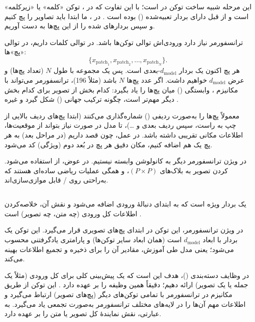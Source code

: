 این مرحله شبیه ساخت توکن در  است؛ با این تفاوت که در ، توکن «کلمه» یا «زیرکلمه» است و از قبل دارای بردار تعبیه‌شده () بوده است \cite{vaswani2017attention}. در  \cite{dosovitskiy2020image}، ما ابتدا باید تصاویر را پچ کنیم و سپس بردارهای ‌شده را از این پچ‌ها به دست آوریم.

ترانسفورمر نیاز دارد ورودی‌اش توالی توکن‌ها باشد. در  توالی کلمات داریم، در  توالی «پچ»‌ها:
\[
\{ x_{\text{patch}_1}, x_{\text{patch}_2}, \dots, x_{\text{patch}_N} \}.
\]
هر پچ اکنون یک بردار \(d_{\text{model}}\)-بعدی است. پس یک مجموعه با طول \(N\) (تعداد پچ‌ها) و عرض \(d_{\text{model}}\) خواهیم داشت.  
اگر عدد پچ‌ها \(N\) باشد (مثلاً 196)، ترانسفورمر می‌تواند با مکانیزم ، وابستگی () میان پچ‌ها را یاد بگیرد: کدام بخش از تصویر برای کدام بخش دیگر مهم‌تر است، چگونه ترکیب جهانی () شکل گیرد و غیره \cite{vaswani2017attention,dosovitskiy2020image}.

معمولاً پچ‌ها را به‌صورت ردیفی () شماره‌گذاری می‌کنند (ابتدا پچ‌های ردیف بالایی از چپ به راست، سپس ردیف بعدی و …)، تا مدل در صورت نیاز بتواند از موقعیت‌ها، اطلاعات مکانی تقریبی داشته باشد.  
در عمل، چون قصد داریم (در مراحل بعد) به هر پچ یک  هم اضافه کنیم، مکان دقیق هر پچ در بُعد دوم (ویژگی) کد می‌شود.

در ویژن ترانسفورمر \cite{dosovitskiy2020image} دیگر به کانولوشن وابسته نیستیم. در عوض، از  استفاده می‌شود.  
 کردن تصویر به بلاک‌های \((P \times P)\)،  و  همگی عملیات ریاضی ساده‌ای هستند که به‌راحتی روی / قابل موازی‌سازی‌اند.

\subsection{}
 یک بردار ویژه است که به ابتدای دنبالهٔ ورودی اضافه می‌شود و نقش آن، خلاصه‌کردن اطلاعات کل ورودی (چه متن، چه تصویر) است \cite{devlin2018bert,dosovitskiy2020image}.

در ویژن ترانسفورمر، این توکن در ابتدای پچ‌های تصویری قرار می‌گیرد.  
این توکن یک بردار با ابعاد \(d_{\text{model}}\) است (همان ابعاد سایر توکن‌ها) و پارامتری یادگرفتنی محسوب می‌شود؛ یعنی مدل طی آموزش، مقادیر آن را برای ذخیره و تجمیع اطلاعات بهینه می‌کند.

در وظایف دسته‌بندی ()، هدف این است که یک پیش‌بینی کلی برای کل ورودی (مثلاً یک جمله یا یک تصویر) ارائه دهیم؛  دقیقاً همین وظیفه را بر عهده دارد \cite{devlin2018bert}. این توکن از طریق مکانیزم  در ترانسفورمر با تمامی توکن‌های دیگر (پچ‌های تصویر) ارتباط می‌گیرد و اطلاعات مهم آن‌ها را در لایه‌های مختلف ترانسفورمر به‌صورت تجمعی یاد می‌گیرد. به عبارتی،  نقش نمایندهٔ کل تصویر یا متن را بر عهده دارد.

